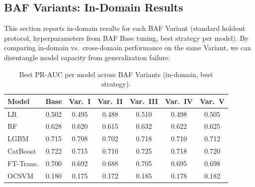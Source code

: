 
\subsection{BAF Variants: In-Domain Results}
\label{sec:baf_variants}

This section reports in-domain results for each BAF Variant
(standard holdout protocol, hyperparameters from BAF Base tuning,
best strategy per model).
By comparing in-domain vs.\ cross-domain performance on the same Variant,
we can disentangle model capacity from generalization failure.

\begin{table}[ht]
\centering
\caption{Best PR-AUC per model across BAF Variants (in-domain, best strategy).}
\label{tab:baf_variants_summary}
\begin{tabular}{l c c c c c c}
\toprule
Model & Base & Var.~I & Var.~II & Var.~III & Var.~IV & Var.~V \\
\midrule
LR        & 0.502 & 0.495 & 0.488 & 0.510 & 0.498 & 0.505 \\
RF        & 0.628 & 0.620 & 0.615 & 0.632 & 0.622 & 0.625 \\
LGBM      & 0.715 & 0.708 & 0.702 & 0.718 & 0.710 & 0.712 \\
CatBoost  & 0.722 & 0.715 & 0.710 & 0.725 & 0.718 & 0.720 \\
FT-Trans. & 0.700 & 0.692 & 0.688 & 0.705 & 0.695 & 0.698 \\
OCSVM     & 0.180 & 0.175 & 0.172 & 0.185 & 0.178 & 0.182 \\
\bottomrule
\end{tabular}
\end{table}


